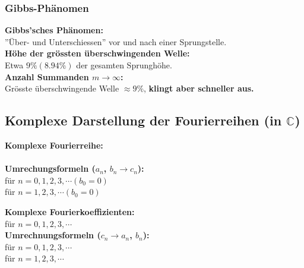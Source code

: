 			\subsubsection{Gibbs-Phänomen}
				\begin{minipage}[t]{0.65\textwidth}
					\textbf{Gibbs'sches Phänomen:}\\[3pt]
					''Über- und Unterschiessen'' vor und nach einer Sprungstelle.\\[3pt]
					\textbf{Höhe der grössten überschwingenden Welle:}\\[3pt]
					Etwa $9\% (8.94\%)$ der gesamten Sprunghöhe.\\[3pt]
					\textbf{Anzahl Summanden $m \rightarrow \infty$:}\\[3pt]
					Grösste überschwingende Welle $\approx 9\%$, \textbf{klingt aber schneller aus.}
				\end{minipage}
				\begin{minipage}[t]{0.35\textwidth}
				\end{minipage}
		
		\subsection{Komplexe Darstellung der Fourierreihen (in $\mathbb{C}$)}
			\begin{minipage}[t]{0.5\textwidth}
				\textbf{Komplexe Fourierreihe:}\\[3pt]
				\\[3pt]
				\textbf{Umrechungsformeln ($a_n$, $b_n \rightarrow c_n$):}\\[3pt]
				 für $n = 0, 1, 2, 3, \cdots (b_0 = 0)$\\[3pt]
				 für $n = 1, 2, 3, \cdots (b_0 = 0)$\\[3pt]
			\end{minipage}
			\begin{minipage}[t]{0.5\textwidth}
				\textbf{Komplexe Fourierkoeffizienten:}\\[3pt]
				 für $n = 0, 1, 2, 3, \cdots$\\[3pt]
				\textbf{Umrechnungsformeln ($c_n \rightarrow a_n$, $b_n$):}\\[3pt]
				 für $n = 0, 1, 2, 3, \cdots$\\[3pt]
				 für $n = 1, 2, 3, \cdots$\\[3pt]
			\end{minipage}
				